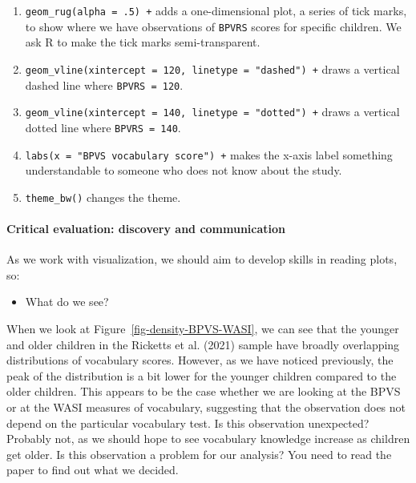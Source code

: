 \documentclass[
  letterpaper,
  DIV=11,
  numbers=noendperiod]{scrreprt}
\let\oldparagraph\paragraph
\renewcommand{\paragraph}[1]{\oldparagraph{#1}\mbox{}}
\providecommand{\tightlist}{%
  \setlength{\itemsep}{0pt}\setlength{\parskip}{0pt}}\usepackage{longtable,booktabs,array}
\begin{document}
\begin{enumerate}
\def\labelenumi{\arabic{enumi}.}
\setcounter{enumi}{4}
\tightlist
\item
  \texttt{geom\_rug(alpha\ =\ .5)\ +} adds a one-dimensional plot, a
  series of tick marks, to show where we have observations of
  \texttt{BPVRS} scores for specific children. We ask R to make the tick
  marks semi-transparent.
\item
  \texttt{geom\_vline(xintercept\ =\ 120,\ linetype\ =\ "dashed")\ +}
  draws a vertical dashed line where \texttt{BPVRS\ =\ 120}.
\item
  \texttt{geom\_vline(xintercept\ =\ 140,\ linetype\ =\ "dotted")\ +}
  draws a vertical dotted line where \texttt{BPVRS\ =\ 140}.
\item
  \texttt{labs(x\ =\ "BPVS\ vocabulary\ score")\ +} makes the x-axis
  label something understandable to someone who does not know about the
  study.
\item
  \texttt{theme\_bw()} changes the theme.
\end{enumerate}

\hypertarget{sec-group-compare-conclusions}{%
\paragraph{Critical evaluation: discovery and
communication}\label{sec-group-compare-conclusions}}

As we work with visualization, we should aim to develop skills in
reading plots, so:

\begin{itemize}
\tightlist
\item
  What do we see?
\end{itemize}

When we look at Figure~\ref{fig-density-BPVS-WASI}, we can see that the
younger and older children in the Ricketts et al. (2021) sample have
broadly overlapping distributions of vocabulary scores. However, as we
have noticed previously, the peak of the distribution is a bit lower for
the younger children compared to the older children. This appears to be
the case whether we are looking at the BPVS or at the WASI measures of
vocabulary, suggesting that the observation does not depend on the
particular vocabulary test. Is this observation unexpected? Probably
not, as we should hope to see vocabulary knowledge increase as children
get older. Is this observation a problem for our analysis? You need to
read the paper to find out what we decided.
\end{document}
